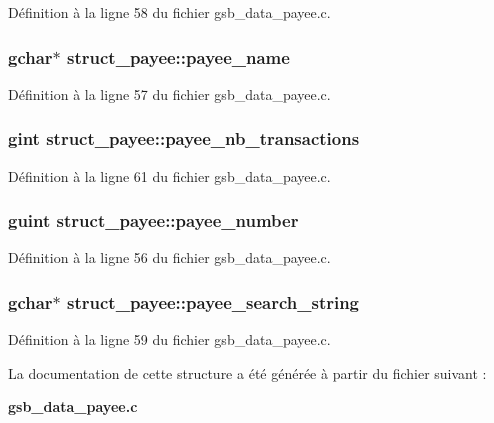 Définition à la ligne 58 du fichier gsb\_\-data\_\-payee.c.

\subsubsection[{payee\_\-name}]{\setlength{\rightskip}{0pt plus 5cm}gchar$\ast$ {\bf struct\_\-payee::payee\_\-name}}\label{structstruct__payee_a592dff20726b196463083b3220660ad3}


Définition à la ligne 57 du fichier gsb\_\-data\_\-payee.c.

\subsubsection[{payee\_\-nb\_\-transactions}]{\setlength{\rightskip}{0pt plus 5cm}gint {\bf struct\_\-payee::payee\_\-nb\_\-transactions}}\label{structstruct__payee_a6718f62eadb9e188733e89dd3241460a}


Définition à la ligne 61 du fichier gsb\_\-data\_\-payee.c.

\subsubsection[{payee\_\-number}]{\setlength{\rightskip}{0pt plus 5cm}guint {\bf struct\_\-payee::payee\_\-number}}\label{structstruct__payee_aac35ee8d9c6190ff9e5fd270527a566f}


Définition à la ligne 56 du fichier gsb\_\-data\_\-payee.c.

\subsubsection[{payee\_\-search\_\-string}]{\setlength{\rightskip}{0pt plus 5cm}gchar$\ast$ {\bf struct\_\-payee::payee\_\-search\_\-string}}\label{structstruct__payee_a96189644240f5e23f86ec32e680902ea}


Définition à la ligne 59 du fichier gsb\_\-data\_\-payee.c.



La documentation de cette structure a été générée à partir du fichier suivant :\begin{DoxyCompactItemize}
\item 
{\bf gsb\_\-data\_\-payee.c}\end{DoxyCompactItemize}
